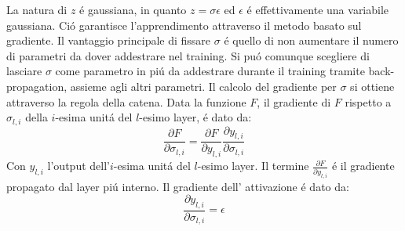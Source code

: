 \documentclass[a4paper,10pt]{article}
\begin{document}
 La natura di $z$ \'e gaussiana, in quanto $z = \sigma \epsilon$ ed $\epsilon$ \'e effettivamente una variabile gaussiana. Ci\'o garantisce l'apprendimento attraverso il metodo basato sul gradiente. Il vantaggio principale di fissare $\sigma$ \'e quello di non aumentare il numero di parametri da dover addestrare nel training. 
 Si pu\'o comunque scegliere di lasciare $\sigma$ come parametro in pi\'u da addestrare durante il training tramite back-propagation, assieme agli altri parametri. Il calcolo del gradiente per $\sigma$ si ottiene attraverso la regola della catena. Data la funzione $F$, il gradiente di $F$ rispetto a $\sigma_{l, i}$ della $i$-esima unit\'a del $l$-esimo layer, \'e dato da:
 \begin{equation} 
  \frac{\partial F}{\partial\sigma_{l, i}} =  \frac{\partial F}{\partial y_{l, i}} \frac{\partial y_{l, i}}{\partial\sigma_{l, i}}
 \end{equation} 
 Con $y_{l, i}$ l'output dell'$i$-esima unit\'a del $l$-esimo layer. Il termine $\frac{\partial F}{\partial y_{l, i}}$ \'e il gradiente propagato dal layer pi\'u interno. Il gradiente dell' attivazione \'e dato da:
 \begin{equation} 
  \frac{\partial y_{l, i}}{\partial\sigma_{l, i}} = \epsilon
 \end{equation} 
\end{document}

